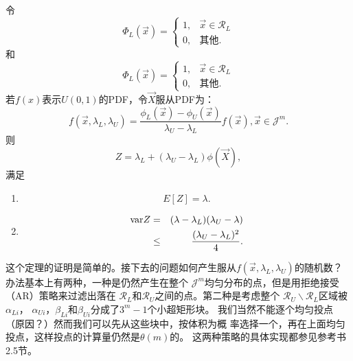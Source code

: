 \begin{theorem}{}
  令
  \begin{equation}
    \Phi_L(\vec{x}) = \left\{
    \begin{array}{ll}
      1,& \vec{x} \in \mathscr{R}_L\\
      0,& \mbox{其他}.
      \end{array}
      \right.
      \label{eq::sta_L}
  \end{equation}
  和
  \begin{equation}
  \Phi_L(\vec{x}) = \left\{
  \begin{array}{ll}
    1,& \vec{x} \in \mathscr{R}_L\\
    0,& \mbox{其他}.
    \end{array}
    \right.
    \label{eq::sta_U}
  \end{equation}
  若$f(x)$表示$U(0, 1)$的PDF，令$\vec{X}$服从PDF为：
  \begin{equation}
    f(\vec{x}, \lambda_L, \lambda_U) = \frac{\phi_L(\vec{x}) -
      \phi_U(\vec{x})}{\lambda_U - \lambda_L}f(\vec{x}), \vec{x} \in
    \mathscr{J}^m.
    \label{eq::hyperrectangle_pdf}
  \end{equation}
  则
  \begin{equation}
    Z = \lambda_L + (\lambda_U - \lambda_L) \phi(\vec{X}),
    \label{eq::hyper_est}
  \end{equation}
  满足
  \begin{enumerate}
  \item
    \begin{equation}
      E[Z] = \lambda.
      \label{eq::hyper_exp}
    \end{equation}
  \item
    \begin{eqnarray}
      \mathrm{var} Z & = & (\lambda - \lambda_L)(\lambda_U - \lambda)
      \label{eq::hyper_var}
      \\
      & \leq & \frac{(\lambda_U - \lambda_L)^2}{4}. \notag
    \end{eqnarray}
  \end{enumerate}
    \label{thm::hyperrectangle}
\end{theorem}

这个定理的证明是简单的。接下去的问题如何产生服从$f(\vec{x}, \lambda_L,
\lambda_U)$的随机数？办法基本上有两种，一种是仍然产生在整个
$\mathscr{J}^m$均匀分布的点，但是用拒绝接受（AR）策略来过滤出落在
$\mathscr{R}_L$和$\mathscr{R}_U$之间的点。第二种是考虑整个
$\mathscr{R}_U \backslash \mathscr{R}_L$区域被$\alpha_{Li}$，
$\alpha_{Ui}$，$\beta_{Li}$和$\beta_{Ui}$分成了$3^m - 1$个小超矩形块。
我们当然不能逐个均匀投点（原因？）然而我们可以先从这些块中，按体积为概
率选择一个，再在上面均匀投点，这样投点的计算量仍然是$\theta(m)$的。
这两种策略的具体实现都参见参考书2.5节。

